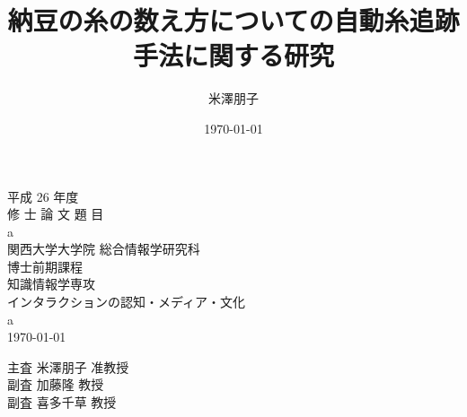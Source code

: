 \documentclass[11pt]{jreport}
\title{納豆の糸の数え方についての自動糸追跡手法に関する研究}
\author{米澤朋子}
\date{\today}
\newcommand{\thetitle}{a}
\newcommand{\theauthor}{a}
\begin{document}
\thispagestyle{empty}
\begin{center}
\huge{平成 26 年度}\\
\Huge{修 士 論 文 題 目}\\
\vspace{1.5cm}\huge{\thetitle}\\ \vspace{3.0cm}
\LARGE{関西大学大学院 総合情報学研究科}\\
\LARGE{博士前期課程}\\
\LARGE{知識情報学専攻}\\
\vspace{0.8cm}\Large{インタラクションの認知・メディア・文化}\\
\vspace{0.8cm}\LARGE{\theauthor}\\ \vspace{1.0cm}
\today\vspace{1.5cm}
\begin{itemize}
\LARGE{主査\hspace{2cm} 米澤朋子 准教授}\\
\LARGE{副査\hspace{2cm} 加藤隆 教授}\\
\LARGE{副査\hspace{2cm} 喜多千草 教授}\\
\end{itemize}
\end{center}


\tableofcontents
\listoftables
\listoffigures










%

%
\end{document}
